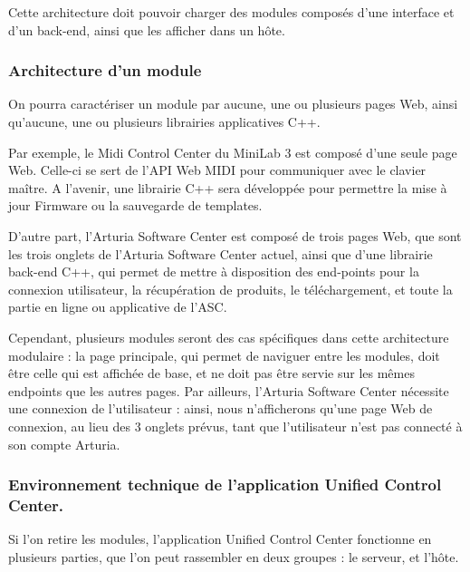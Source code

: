 \documentclass[francais]{rapportPFE}  %
\begin{document}
Cette architecture doit pouvoir charger des modules composés d'une interface et d'un back-end, ainsi que les afficher dans un hôte.

\subsubsection{Architecture d'un module}

On pourra caractériser un module par aucune, une ou plusieurs pages Web, ainsi qu'aucune, une ou plusieurs librairies applicatives C++.

Par exemple, le Midi Control Center du MiniLab 3 est composé d'une seule page Web. Celle-ci se sert de l'API Web MIDI pour communiquer avec le clavier maître. A l'avenir, une librairie C++ sera développée pour permettre la mise à jour Firmware ou la sauvegarde de templates.

D'autre part, l'Arturia Software Center est composé de trois pages Web, que sont les trois onglets de l'Arturia Software Center actuel, ainsi que d'une librairie back-end C++, qui permet de mettre à disposition des end-points pour la connexion utilisateur, la récupération de produits, le téléchargement, et toute la partie en ligne ou applicative de l'ASC.

Cependant, plusieurs modules seront des cas spécifiques dans cette architecture modulaire :
la page principale, qui permet de naviguer entre les modules, doit être celle qui est affichée de base, et ne doit pas être servie sur les mêmes endpoints que les autres pages.
Par ailleurs, l'Arturia Software Center nécessite une connexion de l'utilisateur : ainsi, nous n'afficherons qu'une page Web de connexion, au lieu des 3 onglets prévus, tant que l'utilisateur n'est pas connecté à son compte Arturia.



\subsubsection{Environnement technique de l'application Unified Control Center.}

Si l'on retire les modules, l'application Unified Control Center fonctionne en plusieurs parties, que l'on peut rassembler en deux groupes : le serveur, et l'hôte.
\end{document}
